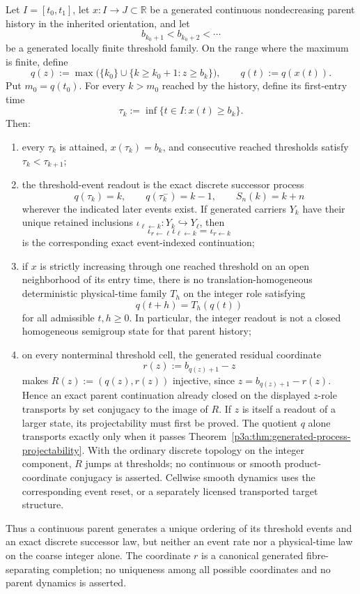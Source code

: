 \documentclass[12pt,a4paper]{article}
\begin{document}
\begin{theorem}
\label{p3a:thm:threshold-event-descent}
Let \(I=[t_0,t_1]\), let \(x:I\to J\subset\mathbb R\) be a generated
continuous nondecreasing parent history in the inherited orientation, and let
\[
 b_{k_0+1}<b_{k_0+2}<\cdots
\]
be a generated locally finite threshold family.  On the range where the
maximum is finite, define
\[
 q(z):=\max\bigl(\{k_0\}\cup\{k\ge k_0+1:z\ge b_k\}\bigr),
 \qquad q(t):=q(x(t)).
\]
Put \(m_0=q(t_0)\).  For every \(k>m_0\) reached by the history, define its
first-entry time
\[
 \tau_k:=\inf\{t\in I:x(t)\ge b_k\}.
\]
Then:
\begin{enumerate}[label=(\roman*),leftmargin=2em]
\item every \(\tau_k\) is attained,
      \(x(\tau_k)=b_k\), and consecutive reached thresholds satisfy
      \(\tau_k<\tau_{k+1}\);
\item the threshold-event readout is the exact discrete successor process
      \[
       q(\tau_k)=k,
       \qquad q(\tau_k^-)=k-1,
       \qquad S_n(k)=k+n
      \]
      wherever the indicated later events exist.  If generated carriers
      \(Y_k\) have their unique retained inclusions
      \(\iota_{\ell\leftarrow k}:Y_k\hookrightarrow Y_\ell\), then
      \[
       \iota_{r\leftarrow\ell}\iota_{\ell\leftarrow k}
       =\iota_{r\leftarrow k}
      \]
      is the corresponding exact event-indexed continuation;
\item if \(x\) is strictly increasing through one reached threshold on an
      open neighborhood of its entry time, there is no
      translation-homogeneous deterministic physical-time family
      \(T_h\) on the integer role satisfying
      \[
       q(t+h)=T_h(q(t))
      \]
      for all admissible \(t,h\ge0\).  In particular, the integer readout is
      not a closed homogeneous semigroup state for that parent history;
\item on every nonterminal threshold cell, the generated residual coordinate
      \[
       r(z):=b_{q(z)+1}-z
      \]
      makes \(R(z):=(q(z),r(z))\) injective, since
      \(z=b_{q(z)+1}-r(z)\).  Hence an exact parent continuation already closed on the displayed
      \(z\)-role transports by set conjugacy to the image of \(R\).
      If \(z\) is itself a readout of a larger state, its projectability
      must first be proved. The quotient \(q\) alone transports exactly
      only when it passes
      Theorem~\ref{p3a:thm:generated-process-projectability}.
      With the ordinary discrete topology on the integer component,
      \(R\) jumps at thresholds; no continuous or smooth product-coordinate
      conjugacy is asserted. Cellwise smooth dynamics uses the corresponding
      event reset, or a separately licensed transported target structure.
\end{enumerate}
Thus a continuous parent generates a unique ordering of its threshold events
and an exact discrete successor law, but neither an event rate nor a
physical-time law on the coarse integer alone.  The coordinate \(r\) is a
canonical generated fibre-separating completion; no uniqueness among all
possible coordinates and no parent dynamics is asserted.
\end{theorem}
\end{document}
